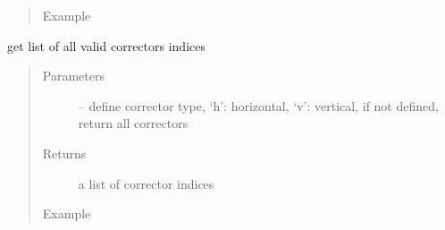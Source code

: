 \documentclass[letterpaper,10pt,english]{sphinxmanual}
\begin{document}
\begin{fulllineitems}
\begin{fulllineitems}
\begin{quote}
\begin{description}
\item[{Example}] \leavevmode
\end{description}\end{quote}

\begin{sphinxVerbatim}[commandchars=\\\{\},formatcom=\scriptsize]
  
\end{sphinxVerbatim}

\end{fulllineitems}


\begin{fulllineitems}
\label{\detokenize{src/apidocs/genopt:genopt.DakotaOC.get_all_cors}}
get list of all valid correctors indices
\begin{quote}\begin{description}
\item[{Parameters}] \leavevmode
{} -- define corrector type, `h': horizontal, `v': vertical, 
if not defined, return all correctors

\item[{Returns}] \leavevmode
a list of corrector indices

\item[{Example}] \leavevmode
\end{description}\end{quote}

\begin{sphinxVerbatim}[commandchars=\\\{\},formatcom=\scriptsize]
  
\end{sphinxVerbatim}

\end{fulllineitems}


\end{fulllineitems}
\end{document}
